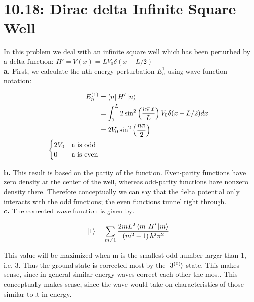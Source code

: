 \documentclass[10pt]{article} %
\begin{document}
\section{10.18: Dirac delta Infinite Square Well}
In this problem we deal with an infinite square well which has been perturbed by a delta function:
$H' = V(x) = LV_0\delta(x-L/2)$\\

\textbf{a.} First, we calculate the nth energy perturbation $E_n^1$ using wave function notation:

\begin{align*}
  E_n^{(1)} &= \bra{n}H'\ket{n}\\
  &= \int_0^L 2\sin^2\left(\frac{n\pi x}{L}\right)V_0\delta(x-L/2)dx\\
  &= 2V_0\sin^2\left(\frac{n\pi}{2}\right)\\
  \begin{cases}
    2V_0 & \mbox{n is odd}\\
    0 & \mbox{n is even}\\
  \end{cases}\\
\end{align*}

\textbf{b.}
This result is based on the parity of the function. Even-parity functions have zero density at the
center of the well, whereas odd-parity functions have nonzero density there. Therefore conceptually
we can say that the delta potential only interacts with the odd functions; the even functions tunnel
right through.\\

\textbf{c.}
The corrected wave function is given by:

\begin{align*}
  \ket{1} = \sum_{m\neq1} \frac{2mL^2\bra{m}H'\ket{m}}{\left(m^2-1\right)\hbar^2\pi^2}\\
\end{align*}

This value will be maximized when m is the smallest odd number larger than 1, i.e, 3. Thus the
ground state is corrected most by the $\ket{3^{(0)}}$ state. This makes sense, since in general
similar-energy waves correct each other the most. This conceptually makes sense, since the wave
would take on characteristics of those similar to it in energy.\\
\end{document}
